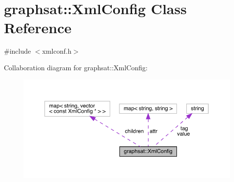 \hypertarget{classgraphsat_1_1_xml_config}{}\section{graphsat\+::Xml\+Config Class Reference}
\label{classgraphsat_1_1_xml_config}


{\ttfamily \#include $<$xmlconf.\+h$>$}



Collaboration diagram for graphsat\+::Xml\+Config\+:\nopagebreak
\begin{figure}[H]
\begin{center}
\leavevmode
\includegraphics[width=350pt]{classgraphsat_1_1_xml_config__coll__graph}
\end{center}
\end{figure}
